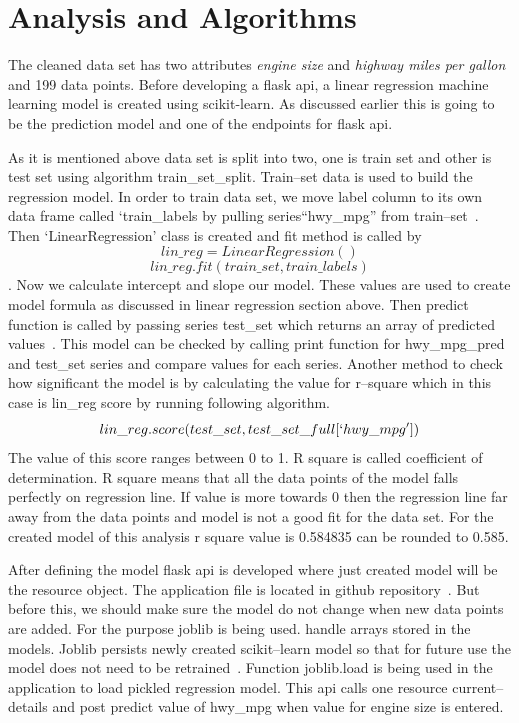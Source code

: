 \section{Analysis and Algorithms}

 The cleaned data set has two attributes \textit{engine size} and
 \textit{highway miles per gallon} and 199 data points. Before developing
 a flask api, a linear regression machine learning model is created using
 scikit-learn. As discussed earlier this is going to be the prediction model
 and one of the endpoints for flask api.

 As it is mentioned above data set is split into two, one is train
 set and other is test set using algorithm train\_set\_split. 
 Train--set data is used to build the regression
 model. In order to train data set, we move label column to its own data frame
 called `train\_labels by pulling  series``hwy\_mpg'' from 
 train--set~\cite{hid-sp18-415-regression}. Then `LinearRegression' 
 class is created and fit 
 method is called by \[lin\_reg = LinearRegression()\] 
 \[lin\_reg.fit(train\_set, train\_labels)\]. Now we calculate intercept and
 slope our model. These values are used to create model formula
 as discussed in linear regression section above. Then predict function is
  called  by passing series test\_set which returns an array of predicted 
  values~\cite{hid-sp18-415-regression}. This model can be checked by calling
  print function for hwy\_mpg\_pred
  and test\_set series and compare values for each series. Another method to
  check how significant the model is by calculating the value for r--square 
  which in this case is lin\_reg score by running following algorithm.  
  \[lin\_reg.score(test\_set, test\_set\_full[`hwy\_mpg'])\]
  The value of this score ranges between 0 to 1. R square is called coefficient
  of determination. R square means that all the data points of the model falls
  perfectly on regression line. If value is more towards 0 then the regression 
  line far away from the data points and model is not a good fit for the data
  set. For the created model of this analysis r square value is 
  0.584835 can be rounded to 0.585.
  
  After defining the model flask api is developed where just created model will 
  be the resource object. The application file is located in github 
  repository~\cite{hid-sp18-415-regressionapi}. But before this,
  we should make sure the model do not 
  change when new data points are added. For the purpose joblib is being used.
  handle arrays stored in the models. Joblib persists newly created
  scikit--learn model so that for future use the model does not need to be
  retrained~\cite{hid-sp18-415-joblib}. Function joblib.load is being used in
  the application to load pickled regression model. This api calls one resource 
  current--details  and post predict value of hwy\_mpg when value for engine
  size is entered. 
   
